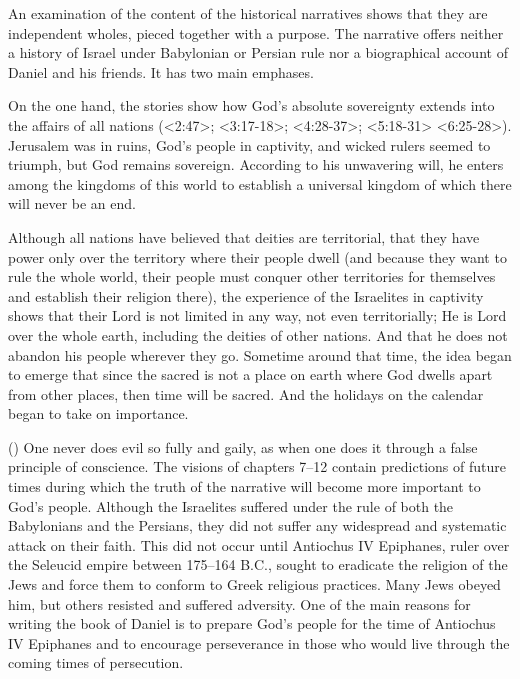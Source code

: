 An examination of the content of the historical narratives shows that they are independent wholes, pieced together with a purpose.
The narrative offers neither a history of Israel under Babylonian or Persian rule nor a biographical account of Daniel and his friends. It has two main emphases.

On the one hand, the stories show how God's absolute sovereignty extends into the affairs of all nations 
(<2:47>; <3:17-18>; <4:28-37>; <5:18-31> <6:25-28>).
Jerusalem was in ruins, God's people in captivity, and wicked rulers seemed to triumph, but God remains sovereign.
According to his unwavering will, he enters among the kingdoms of this world to establish a universal kingdom of which there will never be an end.

Although all nations have believed that deities are territorial, that they have power only over the territory where their people dwell (and because they want to rule the whole world, their people must conquer other territories for themselves and establish their religion there), the experience of the Israelites in captivity shows that their Lord is not limited in any way, not even territorially; He is Lord over the whole earth, including the deities of other nations. And that he does not abandon his people wherever they go. Sometime around that time, the idea began to emerge that since the sacred is not a place on earth where God dwells apart from other places, then time will be sacred. And the holidays on the calendar began to take on importance. 


 (\kern-2mm) {
One never does evil so fully and gaily, 
as when one does it through a false principle of conscience.
}
The visions of chapters 7--12 contain predictions of future times during which the truth of the narrative will become more important to God's people.
Although the Israelites suffered under the rule of both the Babylonians and the Persians, they did not suffer any widespread and systematic attack on their faith. This did not occur until Antiochus IV Epiphanes, ruler over the Seleucid empire between 175--164 B.C., sought to eradicate the religion of the Jews and force them to conform to Greek religious practices. Many Jews obeyed him, but others resisted and suffered adversity. 
One of the main reasons for writing the book of Daniel is to prepare God's people for the time of Antiochus IV Epiphanes and to encourage perseverance in those who would live through the coming times of persecution.


